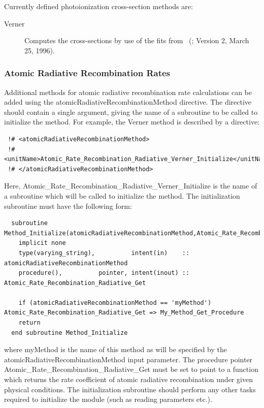 Currently defined photoionization cross-section methods are:
\begin{description}
 \item [{\normalfont \ttfamily Verner}]  Computes the cross-sections by use of the fits from \citeauthor{verner_atomic_1996_1}~(\citeyear{verner_atomic_1996_1}; Version 2, March 25, 1996).
\end{description}

\subsubsection{Atomic Radiative Recombination Rates}

Additional methods for atomic radiative recombination rate calculations can be added using the {\normalfont \ttfamily atomicRadiativeRecombinationMethod} directive. The directive should contain a single argument, giving the name of a subroutine to be called to initialize the method. For example, the {\normalfont \ttfamily Verner} method is described by a directive:
\begin{verbatim}
 !# <atomicRadiativeRecombinationMethod>
 !#  <unitName>Atomic_Rate_Recombination_Radiative_Verner_Initialize</unitName>
 !# </atomicRadiativeRecombinationMethod>
\end{verbatim}
Here, {\normalfont \ttfamily Atomic\_Rate\_Recombination\_Radiative\_Verner\_Initialize} is the name of a subroutine which will be called to initialize the method. The initialization subroutine must have the following form:
\begin{verbatim}
  subroutine Method_Initialize(atomicRadiativeRecombinationMethod,Atomic_Rate_Recombination_Radiative_Get)
    implicit none
    type(varying_string),          intent(in)    :: atomicRadiativeRecombinationMethod
    procedure(),          pointer, intent(inout) :: Atomic_Rate_Recombination_Radiative_Get
    
    if (atomicRadiativeRecombinationMethod == 'myMethod') Atomic_Rate_Recombination_Radiative_Get => My_Method_Get_Procedure
    return
  end subroutine Method_Initialize
\end{verbatim}
where {\normalfont \ttfamily myMethod} is the name of this method as will be specified by the {\normalfont \ttfamily atomicRadiativeRecombinationMethod} input parameter. The procedure pointer {\normalfont \ttfamily Atomic\_Rate\_Recombination\_Radiative\_Get} must be set to point to a function which returns the rate coefficient of atomic radiative recombination under given physical conditions. The initialization subroutine should perform any other tasks required to initialize the module (such as reading parameters etc.).


